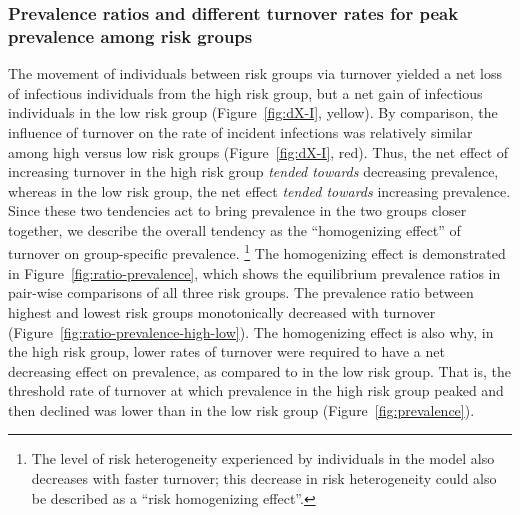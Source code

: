 \subsubsection{Prevalence ratios and different turnover rates for peak prevalence among risk groups}
The movement of individuals between risk groups via turnover yielded
a net loss of infectious individuals from the high risk group, but
a net gain of infectious individuals in the low risk group
(Figure~\ref{fig:dX-I}, yellow).
By comparison, the influence of turnover on
the rate of incident infections was relatively similar
among high versus low risk groups (Figure~\ref{fig:dX-I}, red).
Thus, the net effect of increasing turnover in the high risk group
\emph{tended towards} decreasing prevalence,
whereas in the low risk group,
the net effect \emph{tended towards} increasing prevalence.
Since these two tendencies act to bring prevalence in the two groups
closer together, we describe the overall tendency as
the ``homogenizing effect'' of turnover on group-specific prevalence.%
\footnote{The level of risk heterogeneity experienced by individuals in the model
  also decreases with faster turnover;
  this decrease in risk heterogeneity
  could also be described as a ``risk homogenizing effect''.}
%     
The homogenizing effect is demonstrated in Figure~\ref{fig:ratio-prevalence},
which shows the equilibrium prevalence ratios
in pair-wise comparisons of all three risk groups.
The prevalence ratio between highest and lowest risk groups
monotonically decreased with turnover
(Figure~\ref{fig:ratio-prevalence-high-low}).
The homogenizing effect is also why, in the high risk group,
lower rates of turnover were required
to have a net decreasing effect on prevalence,
as compared to in the low risk group.
That is, the threshold rate of turnover at which
prevalence in the high risk group peaked and then declined
was lower than in the low risk group
(Figure~\ref{fig:prevalence}).
